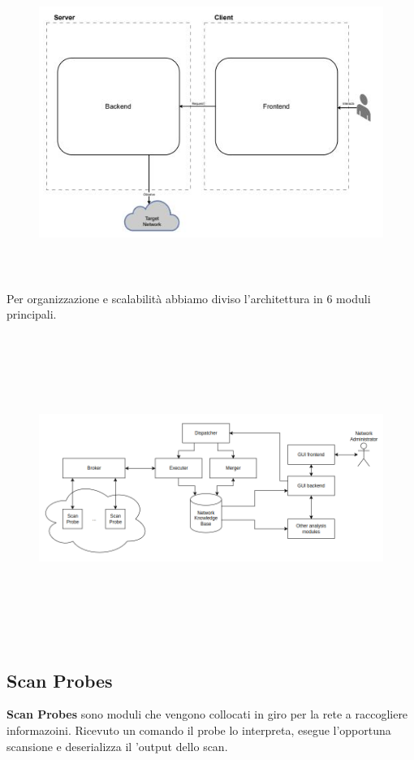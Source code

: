 \documentclass[target=bach,aauheader=,style=]{thud}
\begin{document}
\begin{figure}[h]
  \includegraphics[width=15cm, height=10cm]{client_server}
  \centering
\end{figure}

\FloatBarrier

Per organizzazione e scalabilità abbiamo diviso l'architettura in 6 moduli principali.


\begin{figure}[h]
  \includegraphics[width=15cm, height=10cm]{moduli_new}
  \centering
\end{figure}

\FloatBarrier

\subsection{Scan Probes}
\textbf{Scan Probes} sono moduli che vengono collocati in giro per la rete a raccogliere informazoini. 
Ricevuto un comando il probe lo interpreta, esegue l'opportuna scansione e deserializza il 'output dello scan.
\end{document}
